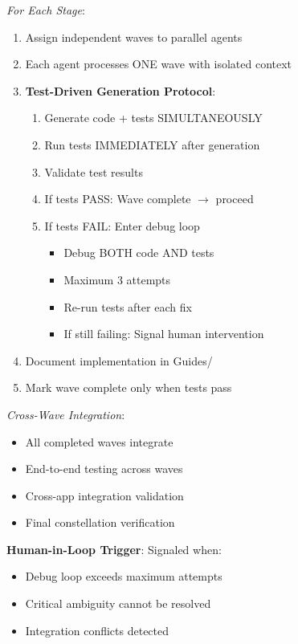 \documentclass[12pt,letterpaper]{article}
\begin{document}
\textit{For Each Stage}:
\begin{enumerate}
    \item Assign independent waves to parallel agents
    \item Each agent processes ONE wave with isolated context
    \item \textbf{Test-Driven Generation Protocol}:
    \begin{enumerate}[label=\alph*)]
        \item Generate code + tests SIMULTANEOUSLY
        \item Run tests IMMEDIATELY after generation
        \item Validate test results
        \item If tests PASS: Wave complete $\rightarrow$ proceed
        \item If tests FAIL: Enter debug loop
        \begin{itemize}
            \item Debug BOTH code AND tests
            \item Maximum 3 attempts
            \item Re-run tests after each fix
            \item If still failing: Signal human intervention
        \end{itemize}
    \end{enumerate}
    \item Document implementation in Guides/
    \item Mark wave complete only when tests pass
\end{enumerate}

\textit{Cross-Wave Integration}:
\begin{itemize}
    \item All completed waves integrate
    \item End-to-end testing across waves
    \item Cross-app integration validation
    \item Final constellation verification
\end{itemize}

\textbf{Human-in-Loop Trigger}: Signaled when:
\begin{itemize}
    \item Debug loop exceeds maximum attempts
    \item Critical ambiguity cannot be resolved
    \item Integration conflicts detected
\end{itemize}
\end{document}
